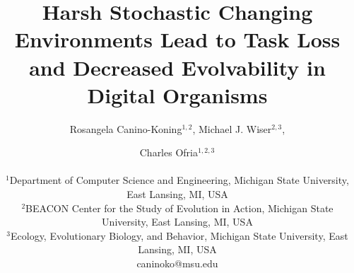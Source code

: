 \documentclass[letterpaper]{article}
\title{Harsh Stochastic Changing Environments Lead to Task Loss and Decreased Evolvability in Digital Organisms}
\author{Rosangela Canino-Koning$^{1,2}$, Michael J. Wiser$^{2,3}$, \and Charles Ofria$^{1,2,3}$ \\
\mbox{}\\
$^{1}$Department of Computer Science and Engineering, Michigan State University, East Lansing, MI, USA \\
$^{2}$BEACON Center for the Study of Evolution in Action, Michigan State University, East Lansing, MI, USA \\
$^{3}$Ecology, Evolutionary Biology, and Behavior, Michigan State University, East Lansing, MI, USA\\
caninoko@msu.edu}
\begin{document}
\maketitle

\begin{abstract}

\end{abstract}
\end{document}
